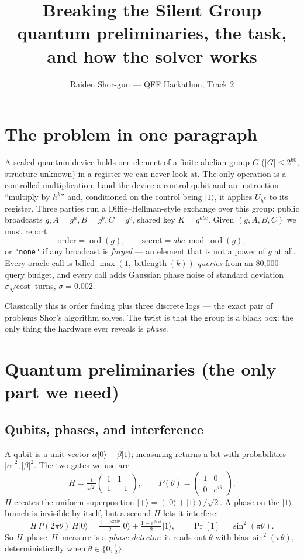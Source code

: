 \documentclass[11pt]{article}
\title{\textbf{Breaking the Silent Group}\\ \large quantum preliminaries, the task, and how the solver works}
\author{Raiden Shor-gun --- QFF Hackathon, Track 2}
\date{}
\newcommand{\ket}[1]{\lvert #1 \rangle}
\theoremstyle{plain}
\theoremstyle{definition}
\begin{document}
\maketitle

\section{The problem in one paragraph}

A sealed quantum device holds one element of a finite abelian group $G$
($|G| \le 2^{60}$, structure unknown) in a register we can never look at.
The only operation is a controlled multiplication: hand the device a
control qubit and an instruction ``multiply by $h^k$'' and, conditioned on
the control being $\ket{1}$, it applies $U_{h^k}$ to its register.
Three parties run a Diffie--Hellman-style exchange over this group:
public broadcasts $g, A=g^a, B=g^b, C=g^c$, shared key $K=g^{abc}$.
Given $(g,A,B,C)$ we must report
\[
  \mathrm{order} = \operatorname{ord}(g), \qquad
  \mathrm{secret} = abc \bmod \operatorname{ord}(g),
\]
or \texttt{"none"} if any broadcast is \emph{forged} --- an element that is
not a power of $g$ at all. Every oracle call is billed
$\max(1,\operatorname{bitlength}(k))$ \emph{queries} from an 80{,}000-query
budget, and every call adds Gaussian phase noise of standard deviation
$\sigma\sqrt{\mathrm{cost}}$ turns, $\sigma = 0.002$.

Classically this is order finding plus three discrete logs --- the exact
pair of problems Shor's algorithm solves. The twist is that the group is
a black box: the only thing the hardware ever reveals is \emph{phase}.

\section{Quantum preliminaries (the only part we need)}

\subsection{Qubits, phases, and interference}

A qubit is a unit vector $\alpha\ket{0}+\beta\ket{1}$; measuring returns a
bit with probabilities $|\alpha|^2, |\beta|^2$. The two gates we use are
\[
  H = \tfrac{1}{\sqrt2}\begin{pmatrix}1&1\\1&-1\end{pmatrix},
  \qquad
  P(\theta) = \begin{pmatrix}1&0\\0&e^{i\theta}\end{pmatrix}.
\]
$H$ creates the uniform superposition $\ket{+}=(\ket0+\ket1)/\sqrt2$.
A phase on the $\ket1$ branch is invisible by itself, but a second $H$
lets it interfere:
\[
  H\,P(2\pi\theta)\,H\ket0
  = \tfrac{1+e^{2\pi i\theta}}{2}\ket0 + \tfrac{1-e^{2\pi i\theta}}{2}\ket1,
  \qquad \Pr[1] = \sin^2(\pi\theta).
\]
So $H$--phase--$H$--measure is a \emph{phase detector}: it reads out
$\theta$ with bias $\sin^2(\pi\theta)$, deterministically when
$\theta\in\{0,\tfrac12\}$.
\end{document}

